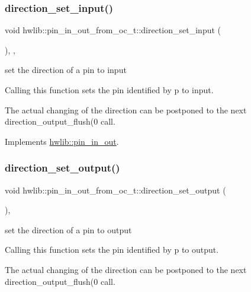 \subsubsection{\texorpdfstring{direction\+\_\+set\+\_\+input()}{direction\_set\_input()}}
{\footnotesize\ttfamily void hwlib\+::pin\+\_\+in\+\_\+out\+\_\+from\+\_\+oc\+\_\+t\+::direction\+\_\+set\+\_\+input (\begin{DoxyParamCaption}{ }\end{DoxyParamCaption})\hspace{0.3cm}{\ttfamily [inline]}, {\ttfamily [override]}, {\ttfamily [virtual]}}

set the direction of a pin to input

Calling this function sets the pin identified by p to input.

The actual changing of the direction can be postponed to the next direction\+\_\+output\+\_\+flush(0 call. 

Implements \hyperlink{classhwlib_1_1pin__in__out_a54ce1a5086d3c9e7b868511b1d46acd0}{hwlib\+::pin\+\_\+in\+\_\+out}.

\mbox{\label{classhwlib_1_1pin__in__out__from__oc__t_a792d6b72134b11f0e9ffe9989b8287e6}} 
\subsubsection{\texorpdfstring{direction\+\_\+set\+\_\+output()}{direction\_set\_output()}}
{\footnotesize\ttfamily void hwlib\+::pin\+\_\+in\+\_\+out\+\_\+from\+\_\+oc\+\_\+t\+::direction\+\_\+set\+\_\+output (\begin{DoxyParamCaption}{ }\end{DoxyParamCaption})\hspace{0.3cm}{\ttfamily [inline]}, {\ttfamily [virtual]}}

set the direction of a pin to output

Calling this function sets the pin identified by p to output.

The actual changing of the direction can be postponed to the next direction\+\_\+output\+\_\+flush(0 call. 

